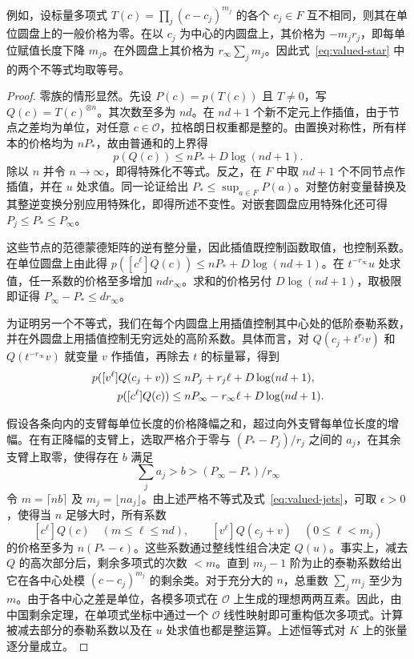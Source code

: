 例如，设标量多项式 $T(c)=\prod_j(c-c_j)^{m_j}$ 的各个 $c_j\in F$ 互不相同，则其在单位圆盘上的一般价格为零。在以 $c_j$ 为中心的内圆盘上，其价格为 $-m_jr_j$，即每单位赋值长度下降 $m_j$。在外圆盘上其价格为 $r_\infty\sum_j m_j$。因此式~\eqref{eq:valued-star} 中的两个不等式均取等号。

\begin{proof}
零族的情形显然。先设 $P(c)=p(T(c))$ 且 $T\ne0$，写 $Q(c)=T(c)^{\otimes n}$。其次数至多为 $nd$。在 $nd+1$ 个新不定元上作插值，由于节点之差均为单位，对任意 $c\in\mathcal O$，拉格朗日权重都是整的。由置换对称性，所有样本的价格均为 $nP_*$，故由普通和的上界得
\[
 p(Q(c))\le nP_*+D\log(nd+1).
\]
除以 $n$ 并令 $n\to\infty$，即得特殊化不等式。反之，在 $F$ 中取 $nd+1$ 个不同节点作插值，并在 $u$ 处求值。同一论证给出 $P_*\le\sup_{a\in F}P(a)$。对整仿射变量替换及其整逆变换分别应用特殊化，即得所述不变性。对嵌套圆盘应用特殊化还可得 $P_j\le P_*\le P_\infty$。

这些节点的范德蒙德矩阵的逆有整分量，因此插值既控制函数取值，也控制系数。在单位圆盘上由此得 $p([c^\ell]Q(c))\le nP_*+D\log(nd+1)$。在 $t^{-r_\infty}u$ 处求值，任一系数的价格至多增加 $nd r_\infty$。求和的价格另付 $D\log(nd+1)$，取极限即证得 $P_\infty-P_*\le d r_\infty$。

为证明另一个不等式，我们在每个内圆盘上用插值控制其中心处的低阶泰勒系数，并在外圆盘上用插值控制无穷远处的高阶系数。具体而言，对 $Q(c_j+t^{r_j}v)$ 和 $Q(t^{-r_\infty}v)$ 就变量 $v$ 作插值，再除去 $t$ 的标量幂，得到
\begin{align}
 p([v^\ell]Q(c_j+v)) &\le nP_j+r_j\ell+D\log(nd+1),\notag\\
 p([c^\ell]Q(c)) &\le nP_\infty-r_\infty\ell+D\log(nd+1).
 \label{eq:valued-jets}
\end{align}

假设各条向内的支臂每单位长度的价格降幅之和，超过向外支臂每单位长度的增幅。在有正降幅的支臂上，选取严格介于零与 $(P_*-P_j)/r_j$ 之间的 $a_j$，在其余支臂上取零，使得存在 $b$ 满足
\[
 \sum_j a_j>b>(P_\infty-P_*)/r_\infty
\]
令 $m=\lceil nb\rceil$ 及 $m_j=\lfloor na_j\rfloor$。由上述严格不等式及式~\eqref{eq:valued-jets}，可取 $\epsilon>0$，使得当 $n$ 足够大时，所有系数
\[
 [c^\ell]Q(c)\quad(m\le\ell\le nd),\qquad
 [v^\ell]Q(c_j+v)\quad(0\le\ell<m_j)
\]
的价格至多为 $n(P_*-\epsilon)$。这些系数通过整线性组合决定 $Q(u)$。事实上，减去 $Q$ 的高次部分后，剩余多项式的次数 $<m$。直到 $m_j-1$ 阶为止的泰勒系数给出它在各中心处模 $(c-c_j)^{m_j}$ 的剩余类。对于充分大的 $n$，总重数 $\sum_j m_j$ 至少为 $m$。由于各中心之差是单位，各模多项式在 $\mathcal O$ 上生成的理想两两互素。因此，由中国剩余定理，在单项式坐标中通过一个 $\mathcal O$ 线性映射即可重构低次多项式。计算被减去部分的泰勒系数以及在 $u$ 处求值也都是整运算。上述恒等式对 $K$ 上的张量逐分量成立。


\end{proof}

